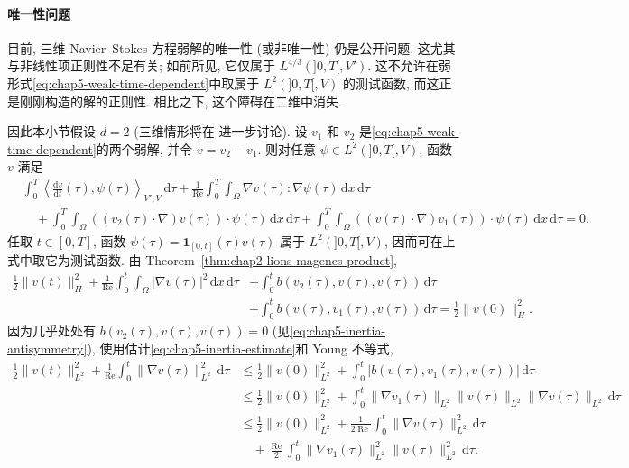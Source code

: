 \paragraph{唯一性问题}

目前, 三维 Navier--Stokes 方程弱解的唯一性 (或非唯一性) 仍是公开问题. 这尤其与非线性项正则性不足有关; 如前所见, 它仅属于 $L^{4/3}(]0,T[,V')$. 这不允许在弱形式\eqref{eq:chap5-weak-time-dependent}中取属于 $L^2(]0,T[,V)$ 的测试函数, 而这正是刚刚构造的解的正则性. 相比之下, 这个障碍在二维中消失.

因此本小节假设 $d=2$ (三维情形将在 进一步讨论). 设 $v_1$ 和 $v_2$ 是\eqref{eq:chap5-weak-time-dependent}的两个弱解, 并令 $v=v_2-v_1$. 则对任意 $\psi\in L^2(]0,T[,V)$, 函数 $v$ 满足
\begin{align*}
 &\int_0^T\left\langle\frac{\mathrm dv}{\mathrm dt}(\tau),\psi(\tau)\right\rangle_{V',V}\,\mathrm d\tau
 +\frac1{\operatorname{Re}}\int_0^T\int_\Omega\nabla v(\tau):\nabla\psi(\tau)\,\mathrm dx\,\mathrm d\tau\\
 &\quad+\int_0^T\int_\Omega((v_2(\tau)\cdot\nabla)v(\tau))\cdot\psi(\tau)\,\mathrm dx\,\mathrm d\tau
 +\int_0^T\int_\Omega((v(\tau)\cdot\nabla)v_1(\tau))\cdot\psi(\tau)\,\mathrm dx\,\mathrm d\tau=0.
\end{align*}
任取 $t\in[0,T]$, 函数 $\psi(\tau)=\mathbf1_{[0,t]}(\tau)v(\tau)$ 属于 $L^2(]0,T[,V)$, 因而可在上式中取它为测试函数. 由 Theorem~\ref{thm:chap2-lions-magenes-product},
\begin{align*}
 \frac12\|v(t)\|_H^2
 +\frac1{\operatorname{Re}}\int_0^t\int_\Omega|\nabla v(\tau)|^2\,\mathrm dx\,\mathrm d\tau
 &+\int_0^tb(v_2(\tau),v(\tau),v(\tau))\,\mathrm d\tau\\
 &+\int_0^tb(v(\tau),v_1(\tau),v(\tau))\,\mathrm d\tau
 =\frac12\|v(0)\|_H^2.
\end{align*}
因为几乎处处有 $b(v_2(\tau),v(\tau),v(\tau))=0$ (见\eqref{eq:chap5-inertia-antisymmetry}), 使用估计\eqref{eq:chap5-inertia-estimate}和 Young 不等式,
\begin{align*}
 \frac12\|v(t)\|_{L^2}^2
 +\frac1{\operatorname{Re}}\int_0^t\|\nabla v(\tau)\|_{L^2}^2\,\mathrm d\tau
 &\leq\frac12\|v(0)\|_{L^2}^2
 +\int_0^t|b(v(\tau),v_1(\tau),v(\tau))|\,\mathrm d\tau\\
 &\leq\frac12\|v(0)\|_{L^2}^2
 +\int_0^t\|\nabla v_1(\tau)\|_{L^2}\|v(\tau)\|_{L^2}\|\nabla v(\tau)\|_{L^2}\,\mathrm d\tau\\
 &\leq\frac12\|v(0)\|_{L^2}^2
 +\frac1{2\operatorname{Re}}\int_0^t\|\nabla v(\tau)\|_{L^2}^2\,\mathrm d\tau\\
 &\quad+\frac{\operatorname{Re}}2\int_0^t\|\nabla v_1(\tau)\|_{L^2}^2\|v(\tau)\|_{L^2}^2\,\mathrm d\tau.
\end{align*}
